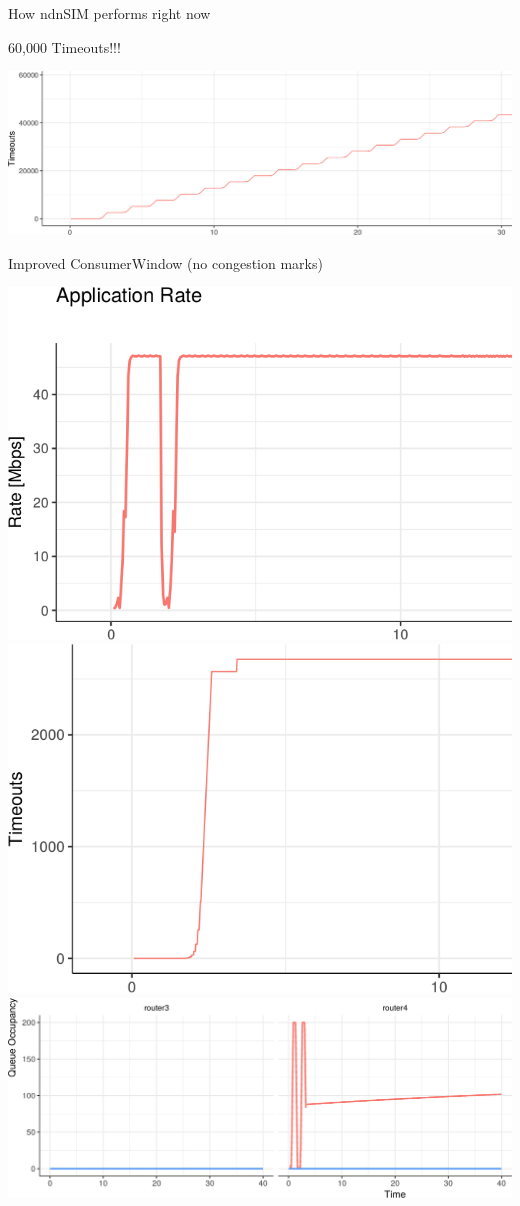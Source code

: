 \begin{frame}{How ndnSIM performs right now}

60,000 Timeouts!!!

\includegraphics[width=\linewidth]{figs/cons2.png}


\end{frame}


\begin{frame}{Improved ConsumerWindow (no congestion marks)}

\includegraphics[width=0.48\linewidth]{figs/cons_new_rate.png}
\hspace{.1em}
\pause
\includegraphics[width=0.48\linewidth]{figs/cons_new_timeouts.png}\\
\pause
\includegraphics[width=\linewidth]{figs/cons_new_queue.png}

\end{frame}


